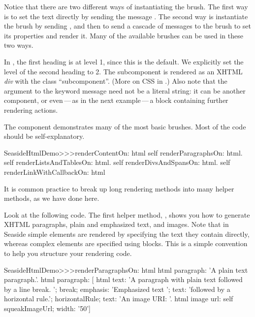 \documentclass[a4paper,10pt,twoside]{book}
\begin{document}
Notice that there are two different ways of instantiating the  brush.
The first way is to set the text directly by sending the message .
The second way is instantiate the brush by sending , and then to send a
cascade of messages to the brush to set its properties and render it.
Many of the available brushes can be used in these two ways.



In , the first heading is at level 1, since this is the default.
We explicitly set the level of the second heading to 2.
The subcomponent is rendered as an XHTML \emph{div} with the  class
``subcomponent''.
(More on CSS in .)
Also note that the argument to the  keyword message need not be a literal
string: it can be another component, or even\,---\,as in the next example\,---\,a block
containing further rendering actions.

The  component demonstrates many of the most basic brushes.
Most of the code should be self-explanatory.

\begin{code}{}
SeasideHtmlDemo>>>renderContentOn: html 
	self renderParagraphsOn: html.
	self renderListsAndTablesOn: html.
	self renderDivsAndSpansOn: html.
	self renderLinkWithCallbackOn: html
\end{code}

It is common practice to break up long rendering methods into many helper methods, as we
have done here.


Look at the following code.  
The first helper method, , shows you how to
generate XHTML paragraphs, plain and emphasized text, and images.
Note that in Seaside simple elements are rendered by specifying the text they contain
directly, whereas complex elements are specified using blocks.
This is a simple convention to help you structure your rendering code.

\begin{code}{}
SeasideHtmlDemo>>>renderParagraphsOn: html 
	html paragraph: 'A plain text paragraph.'.
	html paragraph: [
		html
			text: 'A paragraph with plain text followed by a line break. ';
			break;
			emphasis: 'Emphasized text ';
			text: 'followed by a horizontal rule.';
			horizontalRule;
			text: 'An image URI: '.
		html image
			url: self squeakImageUrl;
			width: '50']
\end{code}
\end{document}
